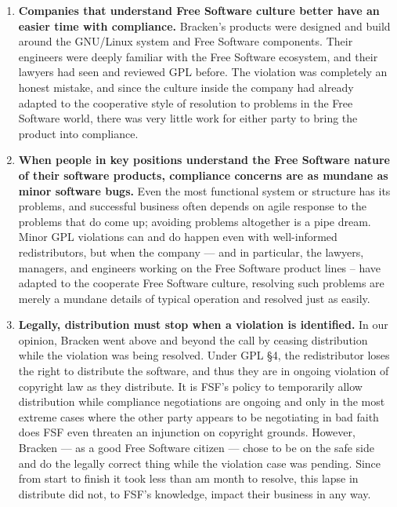 \documentclass[12pt]{report}
\begin{document}
\begin{enumerate}

\item {\bf Companies that understand Free Software culture better have an
  easier time with compliance.}  Bracken's products were designed and
  build around the GNU/Linux system and Free Software components.  Their
  engineers were deeply familiar with the Free Software ecosystem, and
  their lawyers had seen and reviewed GPL before.  The violation was
  completely an honest mistake, and since the culture inside the company
  had already adapted to the cooperative style of resolution to problems
  in the Free Software world, there was very little work for either
  party to bring the product into compliance.

\item {\bf When people in key positions understand the Free Software
  nature of their software products, compliance concerns are as mundane as
  minor software bugs.}  Even the most functional system or structure has
  its problems, and successful business often depends on agile response to
  the problems that do come up; avoiding problems altogether is a pipe
  dream.  Minor GPL violations can and do happen even with well-informed
  redistributors, but when the company --- and in particular, the lawyers,
  managers, and engineers working on the Free Software product lines --
  have adapted to the cooperate Free Software culture, resolving such
  problems are merely a mundane details of typical operation and resolved
  just as easily.

\item {\bf Legally, distribution must stop when a violation is
  identified.}  In our opinion, Bracken went above and beyond the call by
  ceasing distribution while the violation was being resolved.  Under GPL
  \S 4, the redistributor loses the right to distribute the software, and
  thus they are in ongoing violation of copyright law as they distribute.
  It is FSF's policy to temporarily allow distribution while compliance
  negotiations are ongoing and only in the most extreme cases where the
  other party appears to be negotiating in bad faith does FSF even
  threaten an injunction on copyright grounds.  However, Bracken --- as a
  good Free Software citizen --- chose to be on the safe side and do the
  legally correct thing while the violation case was pending.  Since from
  start to finish it took less than am month to resolve, this lapse in
  distribute did not, to FSF's knowledge, impact their business in any
  way.


\end{enumerate}
\end{document}
